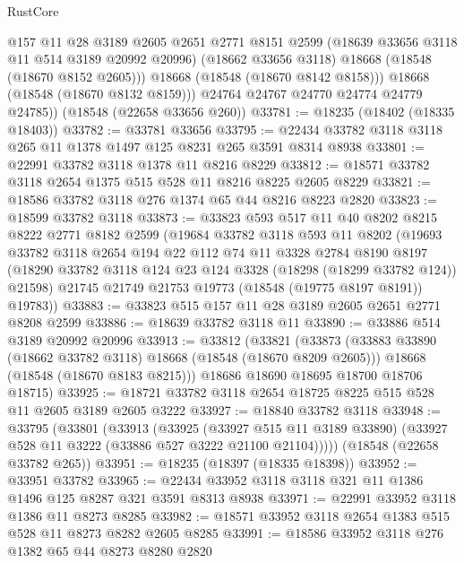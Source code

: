 \begin{lexlean}{RustCore}
\begin{coremodule}
              @157
              @11
              @28
              @3189
              @2605
              @2651
              @2771
              @8151
              @2599
              (@18639 @33656 @3118 @11 @514 @3189 @20992 @20996)
              (@18662 @33656 @3118)
              @18668
              (@18548 (@18670 @8152 @2605)))
            @18668
            (@18548 (@18670 @8142 @8158)))
          @18668
          (@18548 (@18670 @8132 @8159)))
        @24764
        @24767
        @24770
        @24774
        @24779
        @24785))
    (@18548 (@22658 @33656 @260))
@33781 := @18235 (@18402 (@18335 @18403))
@33782 := @33781 @33656
@33795 := @22434 @33782 @3118 @3118 @265 @11 @1378 @1497 @125 @8231 @265 @3591 @8314 @8938
@33801 := @22991 @33782 @3118 @1378 @11 @8216 @8229
@33812 := @18571 @33782 @3118 @2654 @1375 @515 @528 @11 @8216 @8225 @2605 @8229
@33821 := @18586 @33782 @3118 @276 @1374 @65 @44 @8216 @8223 @2820
@33823 := @18599 @33782 @3118
@33873 := @33823
    @593
    @517
    @11
    @40
    @8202
    @8215
    @8222
    @2771
    @8182
    @2599
    (@19684
      @33782
      @3118
      @593
      @11
      @8202
      (@19693
        @33782
        @3118
        @2654
        @194
        @22
        @112
        @74
        @11
        @3328
        @2784
        @8190
        @8197
        (@18290 @33782 @3118 @124 @23 @124 @3328 (@18298 (@18299 @33782 @124)) @21598)
        @21745
        @21749
        @21753
        @19773
        (@18548 (@19775 @8197 @8191))
        @19783))
@33883 := @33823 @515 @157 @11 @28 @3189 @2605 @2651 @2771 @8208 @2599
@33886 := @18639 @33782 @3118 @11
@33890 := @33886 @514 @3189 @20992 @20996
@33913 := @33812
    (@33821
      (@33873
        (@33883 @33890 (@18662 @33782 @3118) @18668 (@18548 (@18670 @8209 @2605)))
        @18668
        (@18548 (@18670 @8183 @8215)))
      @18686
      @18690
      @18695
      @18700
      @18706
      @18715)
@33925 := @18721 @33782 @3118 @2654 @18725 @8225 @515 @528 @11 @2605 @3189 @2605 @3222
@33927 := @18840 @33782 @3118
@33948 := @33795
    (@33801
      (@33913
        (@33925
          (@33927 @515 @11 @3189 @33890)
          (@33927 @528 @11 @3222 (@33886 @527 @3222 @21100 @21104)))))
    (@18548 (@22658 @33782 @265))
@33951 := @18235 (@18397 (@18335 @18398))
@33952 := @33951 @33782
@33965 := @22434 @33952 @3118 @3118 @321 @11 @1386 @1496 @125 @8287 @321 @3591 @8313 @8938
@33971 := @22991 @33952 @3118 @1386 @11 @8273 @8285
@33982 := @18571 @33952 @3118 @2654 @1383 @515 @528 @11 @8273 @8282 @2605 @8285
@33991 := @18586 @33952 @3118 @276 @1382 @65 @44 @8273 @8280 @2820

\end{coremodule}
\end{lexlean}
